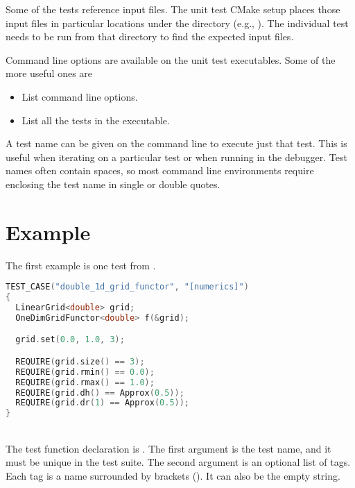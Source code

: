 Some of the tests reference input files. The unit test CMake setup places those input files in particular locations under the  directory (e.g., ).  The individual test needs to be run from that directory to find the expected input files.

Command line options are available on the unit test executables.  Some of the more useful ones are

\begin{itemize}
\item{List command line options.}
\item{List all the tests in the executable.}
\end{itemize}

A test name can be given on the command line to execute just that test.  This is useful when iterating
on a particular test or when running in the debugger.   Test names often contain spaces, so most command line environments require enclosing the test name in single or double quotes.



\section{Example}

The first example is one test from .

\begin{minipage}{\linewidth}
\begin{lstlisting}[language=C++,caption={Unit test example using Catch.},label=CatchExample,basicstyle=\ttfamily]
TEST_CASE("double_1d_grid_functor", "[numerics]")
{
  LinearGrid<double> grid;
  OneDimGridFunctor<double> f(&grid);

  grid.set(0.0, 1.0, 3);

  REQUIRE(grid.size() == 3);
  REQUIRE(grid.rmin() == 0.0);
  REQUIRE(grid.rmax() == 1.0);
  REQUIRE(grid.dh() == Approx(0.5));
  REQUIRE(grid.dr(1) == Approx(0.5));
}
\end{lstlisting}
\end{minipage}\\

The test function declaration is
.
The first argument is the test name, and it must be unique in the test suite.
The second argument is an optional list of tags.  Each tag is a name surrounded by brackets ().  It can also be the empty string.


